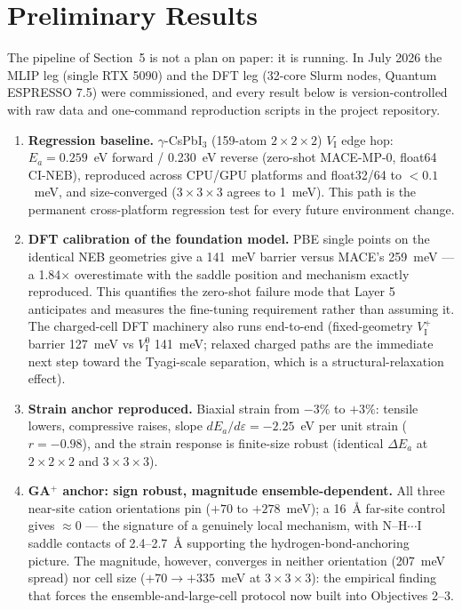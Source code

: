 \documentclass[11pt,a4paper]{article}
\begin{document}
\section{Preliminary Results}

The pipeline of Section~5 is not a plan on paper: it is running. In July 2026 the
MLIP leg (single RTX 5090) and the DFT leg (32-core Slurm nodes, Quantum ESPRESSO
7.5) were commissioned, and every result below is version-controlled with raw data
and one-command reproduction scripts in the project repository.

\begin{enumerate}[leftmargin=1.6em]
\item \textbf{Regression baseline.} $\gamma$-CsPbI$_3$ (159-atom $2\times2\times2$)
$V_{\mathrm{I}}$ edge hop: $E_a = 0.259$~eV forward / 0.230~eV reverse (zero-shot
MACE-MP-0, float64 CI-NEB), reproduced across CPU/GPU platforms and float32/64 to
$<0.1$~meV, and size-converged ($3\times3\times3$ agrees to 1~meV). This path is the
permanent cross-platform regression test for every future environment change.

\item \textbf{DFT calibration of the foundation model.} PBE single points on the
identical NEB geometries give a 141~meV barrier versus MACE's 259~meV --- a
1.84$\times$ overestimate with the saddle position and mechanism exactly reproduced.
This quantifies the zero-shot failure mode that Layer 5 anticipates and measures the
fine-tuning requirement rather than assuming it. The charged-cell DFT machinery also
runs end-to-end (fixed-geometry $V_{\mathrm{I}}^{+}$ barrier 127~meV vs
$V_{\mathrm{I}}^{0}$ 141~meV; relaxed charged paths are the immediate next step
toward the Tyagi-scale separation, which is a structural-relaxation effect).

\item \textbf{Strain anchor reproduced.} Biaxial strain from $-3\%$ to $+3\%$:
tensile lowers, compressive raises, slope $dE_a/d\varepsilon = -2.25$~eV per unit
strain ($r=-0.98$), and the strain response is finite-size robust (identical
$\Delta E_a$ at $2\times2\times2$ and $3\times3\times3$).

\item \textbf{GA$^+$ anchor: sign robust, magnitude ensemble-dependent.} All three
near-site cation orientations pin ($+70$ to $+278$~meV); a 16~\AA{} far-site control
gives $\approx 0$ --- the signature of a genuinely local mechanism, with
N--H$\cdots$I saddle contacts of 2.4--2.7~\AA{} supporting the hydrogen-bond-anchoring
picture. The magnitude, however, converges in neither orientation (207~meV spread)
nor cell size ($+70 \to +335$~meV at $3\times3\times3$): the empirical finding that
forces the ensemble-and-large-cell protocol now built into Objectives 2--3.


\end{enumerate}
\end{document}
